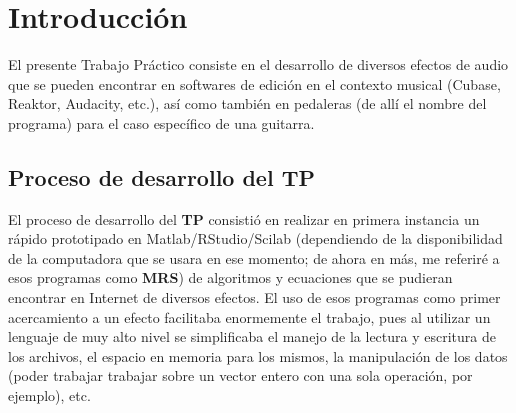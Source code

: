 \documentclass[a4paper,spanish,12pt]{article}
\begin{document}


    
    \maketitle
    

\section{Introducción}
\label{sec:introduccion}

\indent El presente Trabajo Práctico consiste en el desarrollo de diversos efectos de audio que se pueden encontrar en softwares de edición en el contexto musical (Cubase, Reaktor, Audacity, etc.), así como también en pedaleras (de allí el nombre del programa) para el caso específico de una guitarra.

\subsection{Proceso de desarrollo del TP}
\label{subsec:intro-desarrollo}
El proceso de desarrollo del \textbf{TP} consistió en realizar en primera instancia un rápido prototipado en Matlab/RStudio/Scilab (dependiendo de la disponibilidad de la computadora que se usara en ese momento; de ahora en más, me referiré a esos programas como \textbf{MRS}) de algoritmos y ecuaciones que se pudieran encontrar en Internet de diversos efectos. El uso de esos programas como primer acercamiento a un efecto facilitaba enormemente el trabajo, pues al utilizar un lenguaje de muy alto nivel se simplificaba el manejo de la lectura y escritura de los archivos, el espacio en memoria para los mismos, la manipulación de los datos (poder trabajar trabajar sobre un vector entero con una sola operación, por ejemplo), etc.\vspace{\baselineskip}
\end{document}
